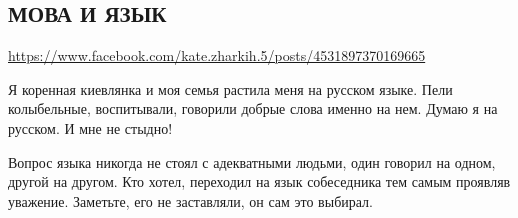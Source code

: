  
 
 
 
 

\subsection{МОВА И ЯЗЫК}
\label{sec:18_06_2020.fb.zharkih_ekaterina.1.mova_jazyk}
\url{https://www.facebook.com/kate.zharkih.5/posts/4531897370169665}

Я коренная киевлянка и моя семья растила меня на русском языке. Пели
колыбельные, воспитывали, говорили добрые слова именно на нем. Думаю я на
русском. И мне не стыдно!

Вопрос языка никогда не стоял с адекватными людьми, один говорил на одном,
другой на другом. Кто хотел, переходил на язык собеседника тем самым проявляв
уважение. Заметьте, его не заставляли, он сам это выбирал.

